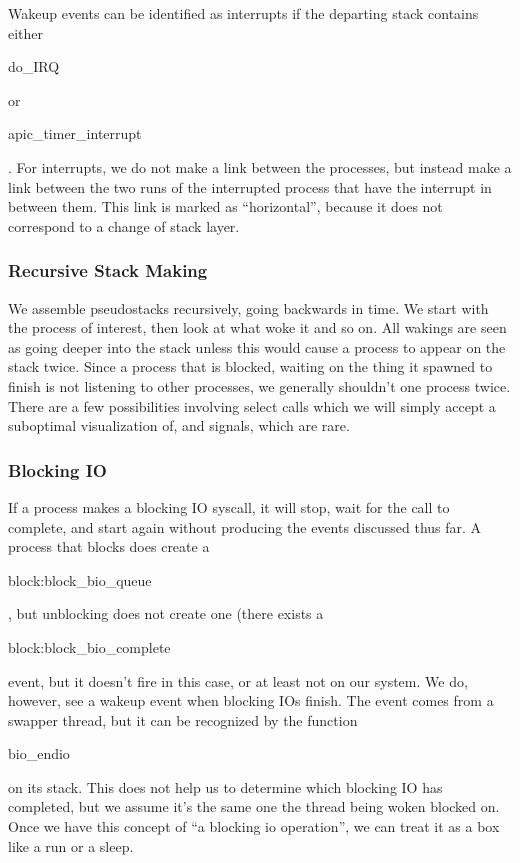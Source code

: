 \documentclass[10pt]{article}
\begin{document}
Wakeup events can be identified as interrupts if the departing stack contains either \begin{tt}do\_IRQ\end{tt} or\\ \begin{tt}apic\_timer\_interrupt\end{tt}.  For interrupts, we do not make a link between the processes, but instead make a link between the two runs of the interrupted process that have the interrupt in between them.  This link is marked as ``horizontal'', because it does not correspond to a change of stack layer.

\subsubsection{Recursive Stack Making}

We assemble pseudostacks recursively, going backwards in time.  We start with the process of interest, then look at what woke it and so on.  All wakings are seen as going deeper into the stack unless this would cause a process to appear on the stack twice.  Since a process that is blocked, waiting on the thing it spawned to finish is not listening to other processes, we generally shouldn't one process twice.  There are a few possibilities involving select calls which we will simply accept a suboptimal visualization of, and signals, which are rare.

\subsubsection{Blocking IO}

If a process makes a blocking IO syscall, it will stop, wait for the call to complete, and start again without producing the events discussed thus far.  A process that blocks does create a \begin{tt}block:block\_bio\_queue\end{tt}, but unblocking does not create one (there exists a \begin{tt}block:block\_bio\_complete\end{tt} event, but it doesn't fire in this case, or at least not on our system.  We do, however, see a wakeup event when blocking IOs finish.  The event comes from a swapper thread, but it can be recognized by the function \begin{tt}bio\_endio\end{tt} on its stack.  This does not help us to determine which blocking IO has completed, but we assume it's the same one the thread being woken blocked on.  Once we have this concept of ``a blocking io operation'', we can treat it as a box like a run or a sleep.
\end{document}
